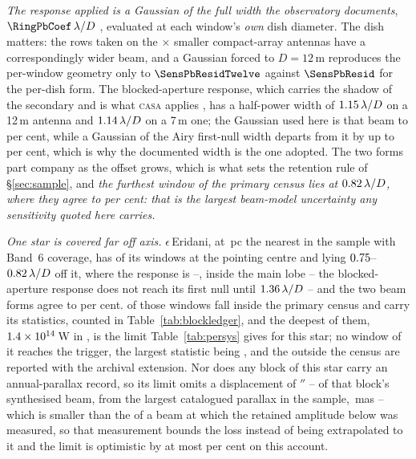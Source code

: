 \emph{The response applied is a Gaussian of the full width the observatory
documents}, $\RingPbCoef\,\lambda/D$ \citep{ALMAHandbook}, evaluated at each
window's \emph{own} dish diameter. The dish matters: the \PbNAcaRow{} rows
taken on the \PbAcaRatio$\times$ smaller compact-array antennas have a
correspondingly wider beam, and a Gaussian forced to $D=12$\,m reproduces the
per-window geometry only to $\SensPbResidTwelve$ against $\SensPbResid$ for
the per-dish form. The blocked-aperture response, which carries the shadow of
the secondary and is what \textsc{casa} applies \citep{CASA2022}, has a
half-power width of $1.15\,\lambda/D$ on a 12\,m antenna and
$1.14\,\lambda/D$ on a 7\,m one; the Gaussian used here is that
beam to \BmDocAiryPct{} per cent, while a Gaussian of the Airy first-null
width departs from it by up to \BmModelMaxNullPct{} per cent, which is why
the documented width is the one adopted. The two forms part company as the
offset grows, which is what sets the retention rule of
\S\ref{sec:sample}, and \emph{the furthest
window of the primary census lies at $0.82\,\lambda/D$, where they
agree to \BmCensusWorstPct{} per cent: that is the largest beam-model
uncertainty any sensitivity quoted here carries.}

\emph{One star is covered far off axis.} $\epsilon$\,Eridani, at
\BmEpsDistPc\,pc the nearest in the sample with Band~6 coverage, has
\BmEpsNOn{} of its \BmEpsNWin{} windows at the pointing centre and
\BmEpsNOff{} lying $0.75$--$0.82\,\lambda/D$ off it, where the
response is \BmEpsRespLo--\BmEpsRespHi, inside the main lobe -- the
blocked-aperture response does not reach its first null until
$1.36\,\lambda/D$ -- and the two beam forms agree to
\BmEpsAgreePct{} per cent. \BmEpsNCensus{} of those windows fall inside the
primary census and carry its statistics, counted in
Table~\ref{tab:blockledger}, and the deepest of them, $1.4\times10^{14}$\,W in
\BmEpsCenEb, is the limit Table~\ref{tab:persys} gives for this star; no
window of it reaches the trigger, the largest statistic being \BmEpsTMax,
and the \BmEpsNExt{} outside the census are reported with the archival
extension. Nor does any block of this star carry an annual-parallax record,
so its limit omits a displacement of \ExCenPxArcsec$''$ --
\ExCenPxBeams{} of that block's synthesised beam, from the largest catalogued
parallax in the sample, \BmEpsPlxMas\,mas -- which is smaller than the
\SensPxSmallBeams{} of a beam at which the retained amplitude below was
measured, so that measurement bounds the loss instead of being extrapolated
to it and the limit is optimistic by at most \BmEpsPxBoundPct{} per cent on
this account.

